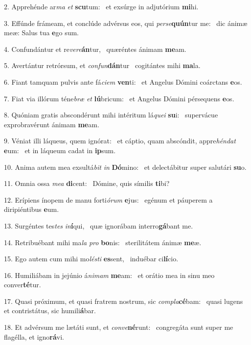 2. Apprehénde ar\textit{ma} \textit{et} \textbf{scu}tum: \ast\  et exsúrge in adjutórium \textbf{mi}hi.\

3. Effúnde frámeam, et conclúde advérsus eos, qui \textit{per}\textit{se}\textbf{quún}tur me: \ast\  dic ánimæ meæ: Salus tua \textbf{e}go sum.\

4. Confundántur et re\textit{ve}\textit{re}\textbf{án}tur, \ast\  quæréntes ánimam \textbf{me}am.\

5. Avertántur retrórsum, et \textit{con}\textit{fun}\textbf{dán}tur \ast\  cogitántes mihi \textbf{ma}la.\

6. Fiant tamquam pulvis ante fá\textit{ci}\textit{em} \textbf{ven}ti: \ast\  et Angelus Dómini coárctans \textbf{e}os.\

7. Fiat via illórum téne\textit{bræ} \textit{et} \textbf{lú}bricum: \ast\  et Angelus Dómini pérsequens \textbf{e}os.\

8. Quóniam gratis abscondérunt mihi intéritum lá\textit{que}\textit{i} \textbf{su}i: \ast\  supervácue exprobravérunt ánimam \textbf{me}am.\

9. Véniat illi láqueus, quem ignórat: \dag\  et cáptio, quam abscóndit, appre\textit{hén}\textit{dat} \textbf{e}um: \ast\  et in láqueum cadat in \textbf{ip}sum.\

10. Anima autem mea exsultá\textit{bit} \textit{in} \textbf{Dó}mino: \ast\  et delectábitur super salutári \textbf{su}o.\

11. Omnia ossa \textit{me}\textit{a} \textbf{di}cent: \ast\  Dómine, quis símilis \textbf{ti}bi?\

12. Erípiens ínopem de manu forti\textit{ó}\textit{rum} \textbf{e}jus: \ast\  egénum et páuperem a diripiéntibus \textbf{e}um.\

13. Surgéntes tes\textit{tes} \textit{in}\textbf{í}qui, \ast\  quæ ignorábam interro\textbf{gá}bant me.\

14. Retribuébant mihi ma\textit{la} \textit{pro} \textbf{bo}nis: \ast\  sterilitátem ánimæ \textbf{me}æ.\

15. Ego autem cum mihi mo\textit{lés}\textit{ti} \textbf{es}sent, \ast\  induébar ci\textbf{lí}cio.\

16. Humiliábam in jejúnio á\textit{ni}\textit{mam} \textbf{me}am: \ast\  et orátio mea in sinu meo conver\textbf{té}tur.\

17. Quasi próximum, et quasi fratrem nostrum, sic \textit{com}\textit{pla}\textbf{cé}bam: \ast\  quasi lugens et contristátus, sic humili\textbf{á}bar.\

18. Et advérsum me lætáti sunt, et \textit{con}\textit{ve}\textbf{né}runt: \ast\  congregáta sunt super me flagélla, et igno\textbf{rá}vi.\

